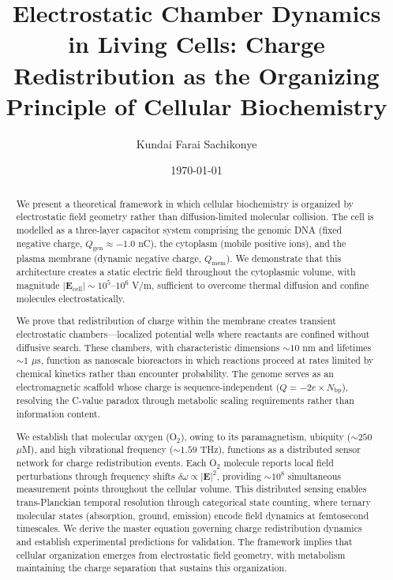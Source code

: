 \documentclass[twocolumn,10pt,aps,prd,superscriptaddress,floatfix,nofootinbib]{revtex4-2}
\theoremstyle{remark}
\begin{document}
\title{Electrostatic Chamber Dynamics in Living Cells: Charge Redistribution as the Organizing Principle of Cellular Biochemistry}

\author{Kundai Farai Sachikonye}

\date{\today}

\begin{abstract}
We present a theoretical framework in which cellular biochemistry is organized by electrostatic field geometry rather than diffusion-limited molecular collision. The cell is modelled as a three-layer capacitor system comprising the genomic DNA (fixed negative charge, $Q_{\mathrm{gen}} \approx -1.0$ nC), the cytoplasm (mobile positive ions), and the plasma membrane (dynamic negative charge, $Q_{\mathrm{mem}}$). We demonstrate that this architecture creates a static electric field throughout the cytoplasmic volume, with magnitude $|\mathbf{E}_{\mathrm{cell}}| \sim 10^{5}$--$10^{6}$ V/m, sufficient to overcome thermal diffusion and confine molecules electrostatically.

We prove that redistribution of charge within the membrane creates transient electrostatic chambers---localized potential wells where reactants are confined without diffusive search. These chambers, with characteristic dimensions $\sim 10$ nm and lifetimes $\sim 1$ $\mu$s, function as nanoscale bioreactors in which reactions proceed at rates limited by chemical kinetics rather than encounter probability. The genome serves as an electromagnetic scaffold whose charge is sequence-independent ($Q = -2e \times N_{\mathrm{bp}}$), resolving the C-value paradox through metabolic scaling requirements rather than information content.

We establish that molecular oxygen (O$_2$), owing to its paramagnetism, ubiquity ($\sim 250$ $\mu$M), and high vibrational frequency ($\sim 1.59$ THz), functions as a distributed sensor network for charge redistribution events. Each O$_2$ molecule reports local field perturbations through frequency shifts $\delta\omega \propto |\mathbf{E}|^2$, providing $\sim 10^{8}$ simultaneous measurement points throughout the cellular volume. This distributed sensing enables trans-Planckian temporal resolution through categorical state counting, where ternary molecular states (absorption, ground, emission) encode field dynamics at femtosecond timescales. We derive the master equation governing charge redistribution dynamics and establish experimental predictions for validation. The framework implies that cellular organization emerges from electrostatic field geometry, with metabolism maintaining the charge separation that sustains this organization.
\end{abstract}
\end{document}

